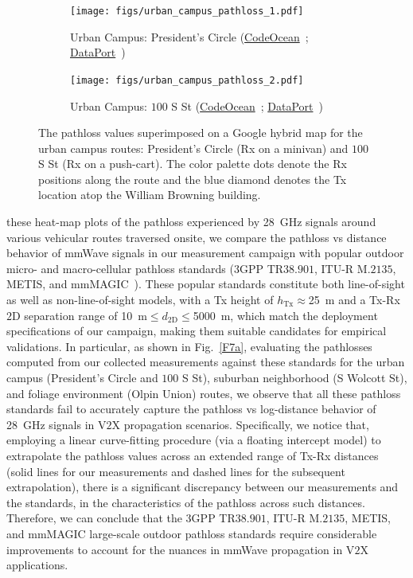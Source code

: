 \documentclass[10pt, twocolumn]{IEEEtran}
\begin{document}
{\begin{figure} [t]
\begin{subfigure}{0.564\linewidth}
        \centering
        \texttt{[image: figs/urban\_campus\_pathloss\_1.pdf]}
        \caption{Urban Campus: President's Circle (\href{https://codeocean.com/capsule/9545863/tree}{CodeOcean}~\cite{CodeOcean}; \href{http://ieee-dataport.org/12580}{DataPort}~\cite{DataPort})}
        \label{F5a}
    \end{subfigure}
    \begin{subfigure}{0.426\linewidth}
        \centering
        \texttt{[image: figs/urban\_campus\_pathloss\_2.pdf]}
        \caption{Urban Campus: $100$ S St (\href{https://codeocean.com/capsule/9545863/tree}{CodeOcean}~\cite{CodeOcean}; \href{http://ieee-dataport.org/12580}{DataPort}~\cite{DataPort})}
        \label{F5b}
    \end{subfigure}
    \vspace{-5mm}
    \caption{The pathloss values superimposed on a Google hybrid map for the urban campus routes: President's Circle (Rx on a minivan) and $100$ S St (Rx on a push-cart). The color palette dots denote the Rx positions along the route and the blue diamond denotes the Tx location atop the William Browning building.}
    \vspace{-3mm}
    \label{F5}
\end{figure}
 these heat-map plots of the pathloss experienced by \SI{28}{\giga\hertz} signals around various vehicular routes traversed onsite, we compare the pathloss vs distance behavior of mmWave signals in our measurement campaign with popular outdoor micro- and macro-cellular pathloss standards ($3$GPP TR$38.901$, ITU-R M$.2135$, METIS, and mmMAGIC~\cite{MacCartneyModelsOverview}). These popular standards constitute both line-of-sight as well as non-line-of-sight models, with a Tx height of $h_{\text{Tx}}{\approx}$\SI{25}{\meter} and a Tx-Rx $2$D separation range of \SI{10}{\meter}${\leq}d_{2\text{D}}{\leq}$\SI{5000}{\meter}, which match the deployment specifications of our campaign, making them suitable candidates for empirical validations. In particular, as shown in Fig.~\ref{F7a}, evaluating the pathlosses computed from our collected measurements against these standards for the urban campus (President's Circle and $100$ S St), suburban neighborhood (S Wolcott St), and foliage environment (Olpin Union) routes, we observe that all these pathloss standards fail to accurately capture the pathloss vs log-distance behavior of \SI{28}{\giga\hertz} signals in V$2$X propagation scenarios. Specifically, we notice that, employing a linear curve-fitting procedure (via a floating intercept model) to extrapolate the pathloss values across an extended range of Tx-Rx distances (solid lines for our measurements and dashed lines for the subsequent extrapolation), there is a significant discrepancy between our measurements and the standards, in the characteristics of the pathloss across such distances. Therefore, we can conclude that the $3$GPP TR$38.901$, ITU-R M$.2135$, METIS, and mmMAGIC large-scale outdoor pathloss standards require considerable improvements to account for the nuances in mmWave propagation in V$2$X applications.
}
\end{document}
